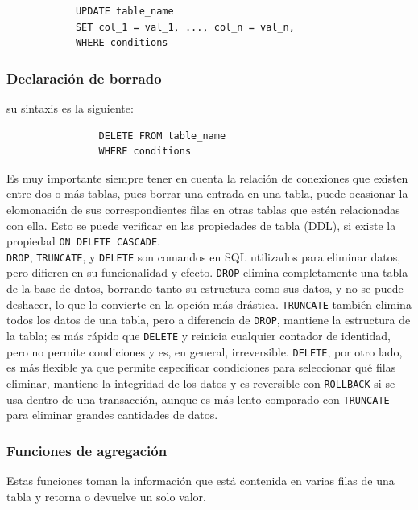             \begin{verbatim}
            UPDATE table_name
            SET col_1 = val_1, ..., col_n = val_n,
            WHERE conditions
            \end{verbatim}

        \subsubsection{Declaración de borrado}

            su sintaxis es la siguiente:

            \begin{verbatim}
                DELETE FROM table_name
                WHERE conditions
            \end{verbatim}

            Es muy importante siempre tener en cuenta la relación de conexiones que existen entre dos o más tablas, pues borrar una entrada en una tabla, puede ocasionar la elomonación de sus correspondientes filas en otras tablas que estén relacionadas con ella. Esto se puede verificar en las propiedades de tabla (DDL), si existe la propiedad \texttt{ON DELETE CASCADE}. \\

            \texttt{DROP}, \texttt{TRUNCATE}, y \texttt{DELETE} son comandos en SQL utilizados para eliminar datos, pero difieren en su funcionalidad y efecto. \texttt{DROP} elimina completamente una tabla de la base de datos, borrando tanto su estructura como sus datos, y no se puede deshacer, lo que lo convierte en la opción más drástica. \texttt{TRUNCATE} también elimina todos los datos de una tabla, pero a diferencia de \texttt{DROP}, mantiene la estructura de la tabla; es más rápido que \texttt{DELETE} y reinicia cualquier contador de identidad, pero no permite condiciones y es, en general, irreversible. \texttt{DELETE}, por otro lado, es más flexible ya que permite especificar condiciones para seleccionar qué filas eliminar, mantiene la integridad de los datos y es reversible con \texttt{ROLLBACK} si se usa dentro de una transacción, aunque es más lento comparado con \texttt{TRUNCATE} para eliminar grandes cantidades de datos.

        \subsubsection{Funciones de agregación}

            Estas funciones toman la información que está contenida en varias filas de una tabla y retorna o devuelve un solo valor.

